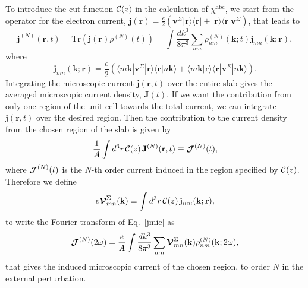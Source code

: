 \documentclass[floatfix,prb,aps,superscriptaddress,showpacs,11pt,preprint,letterpaper]{revtex4}
\begin{document}
To introduce the
cut function ${\mathbf{\cal C}}(z)$ in
the calculation of $\chi^{\mathrm{a}\mathrm{b}\mathrm{c}}$, we start from 
the operator for the electron current,
$\mathbf{j}(\mathbf{r})=\frac{e}{2}\left(\mathbf{v}^\Sigma | \mathbf{r}\rangle\langle\mathbf{r} |
+ | \mathbf{r}\rangle\langle\mathbf{r} | \mathbf{v}^\Sigma\right)$, that leads to
\begin{equation}
\mathbf{j}^{(N)}(\mathbf{r},t)=\mathrm{Tr}(\mathbf{j}(\mathbf{r})\rho^{(N)}(t))
=
\int \frac{dk^3}{8\pi^3}
\sum_{nm}
\rho^{(N)}_{nm}(\mathbf{k};t)\mathbf{j}_{mn}(\mathbf{k};\mathbf{r})
,
\label{jmic}
\end{equation}
where 
\begin{equation}
\mathbf{j}_{mn}(\mathbf{k};\mathbf{r})=
\frac{e}{2}
\left(
\langle m\mathbf{k} | \mathbf{v}^\Sigma | \mathbf{r}\rangle \langle\mathbf{r}|n\mathbf{k}\rangle
+
\langle m\mathbf{k}|\mathbf{r}\rangle\langle\mathbf{r} | \mathbf{v}^\Sigma | n\mathbf{k}\rangle
\right).
\label{jmic3}
\end{equation}
Integrating the microscopic current $\mathbf{j}(\mathbf{r},t)$ over
the entire slab gives the averaged microscopic current density, $\mathbf{J}(t)$. 
If we want the contribution from only one region of the unit cell 
towards the total current, we can integrate $\mathbf{j}({\mathbf r},t)$ 
over the desired region. Then the contribution 
to the current density from the
chosen region of the slab is given by
\begin{equation*}
\frac{1}{A}\int d^3r\, {\mathbf{\cal C}}(z)\, 
\mathbf{J}^{(N)} (\mathbf{r},t)
 \equiv \boldsymbol{\mathcal{\cal J}}^{(N)}(t),
\end{equation*}
where $\boldsymbol{\mathcal{\cal J}}^{(N)}(t)$ is the $N$-th order current induced in the
region specified by ${\mathbf{\cal C}}(z)$.
Therefore we define
\begin{equation}
e{\boldsymbol{\mathcal{V}}}^{\Sigma}_{mn}(\mathbf{k})
\equiv
\int d^3r\, {\mathbf{\cal C}}(z)\,\mathbf{j}_{mn}({\mathbf{k}};\mathbf{r}),
\label{vcal}
\end{equation}
to write the Fourier transform of Eq.~\eqref{jmic} as
\begin{equation}
\boldsymbol{\mathcal{\cal J}}^{(N)}(2\omega)=\frac{e}{A}
\int \frac{dk^3}{8\pi^3}
\sum_{mn}
\boldsymbol{\mathcal{\cal V}}^{\Sigma}_{mn}(\mathbf{k}) 
\rho^{(N)}_{nm}(\mathbf{k};2\omega) 
, 
\label{jmac2}
\end{equation}
that gives the induced microscopic current of the chosen region, to order $N$ 
in the external perturbation. 
\end{document}
